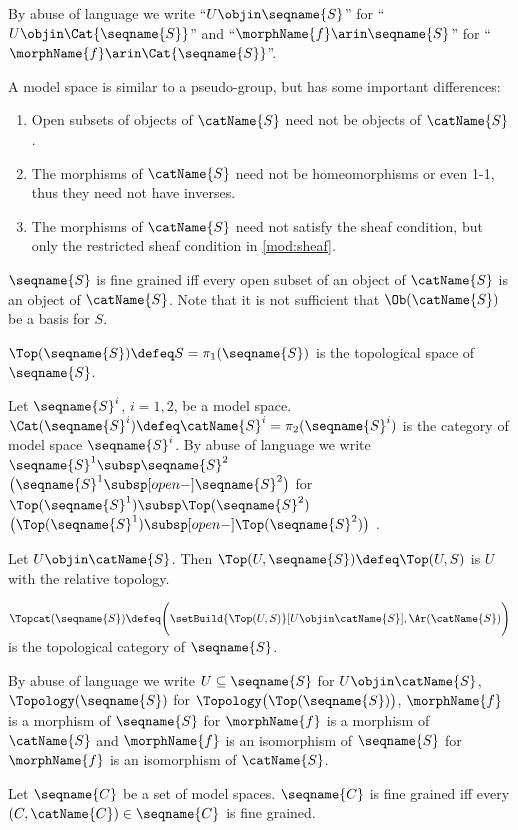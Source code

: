 \documentclass{article}
\begin{document}
\begin{definition}
By abuse of language we write
{\textquotedblleft}$U \objin \seqname{S}${\textquotedblright} for
{\textquotedblleft}$U \objin \Cat{\seqname{S}}${\textquotedblright} and
{\textquotedblleft}$\morphName{f} \arin \seqname{S}${\textquotedblright}
for
{\textquotedblleft}$\morphName{f} \arin \Cat{\seqname{S}}${\textquotedblright}.

\begin{remark}
A model space is similar to a pseudo-group, but has some important
differences:
\begin{enumerate}
\item
Open subsets of objects of $\catName{S}$ need not be objects of
$\catName{S}$.

\item
The morphisms of $\catName{S}$ need not be homeomorphisms or even 1-1,
thus they need not have inverses.

\item
The morphisms of $\catName{S}$ need not satisfy the sheaf condition,
but only the restricted sheaf condition in \cref{mod:sheaf}.
\end{enumerate}
\end{remark}

$\seqname{S}$ is fine grained iff every open subset of an object of
$\catName{S}$ is an object of $ \catName{S}$. Note that it is not
sufficient that $\Ob(\catName{S})$ be a basis for $S$.

$\Top(\seqname{S}) \defeq S = \pi_1(\seqname{S})$ is the topological
space of $\seqname{S}$.

Let $\seqname{S}^i$, $i=1,2$, be a model space.
$\Cat(\seqname{S}^i) \defeq \catName{S}^i = \pi_2(\seqname{S}^i)$ is the
category of model space $\seqname{S}^i$.
By abuse of language we write $\seqname{S}^1 \subsp \seqname{S}^2$
$\bigl ( \seqname{S}^1 \subsp[open-] \seqname{S}^2 \bigr )$ for
$\Top(\seqname{S}^1) \subsp \Top(\seqname{S}^2)$
$\bigl ( \Top(\seqname{S}^1) \subsp[open-] \Top(\seqname{S}^2) \bigr )$ .

Let $U \objin \catName{S}$. Then $\Top(U,\seqname{S}) \defeq \Top(U,S)$
is $U$ with the relative topology.

$
  \Topcat(\seqname{S}) \defeq
  \Biggl (
    \setBuild
      {{\Top(U,S)}}%
      [{U \objin \catName{S}}],
    \Ar(\catName{S})
  \Biggr )
$
is the topological category of $\seqname{S}$.

By abuse of language we write $U \subseteq \seqname{S}$ for
$U \objin \catName{S}$, $\Topology(\seqname{S})$ for
$\Topology \bigl ( \Top(\seqname{S}) \bigr )$, $\morphName{f}$ is a
morphism of $\seqname{S}$ for $\morphName{f}$ is a morphism of
$\catName{S}$ and $\morphName{f}$ is an isomorphism of $\seqname{S}$ for
$\morphName{f}$ is an isomorphism of $\catName{S}$.

Let $\seqname{C}$ be a set of model spaces. $\seqname{C}$ is fine
grained iff every $(C,\catName{C}) \in \seqname{C}$ is fine grained.
\end{definition}
\end{document}
